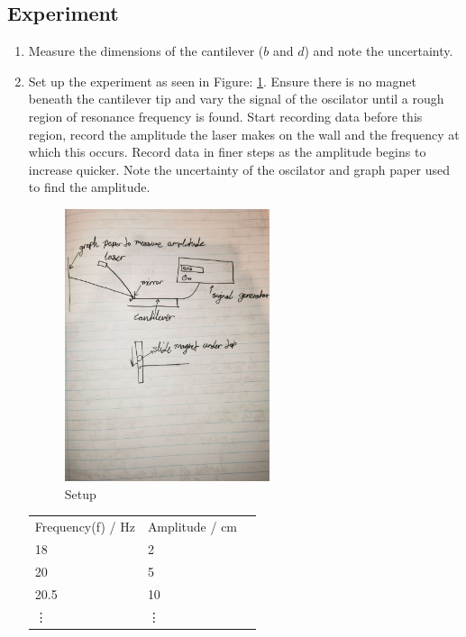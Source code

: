 \documentclass{article}
\begin{document}
\subsection*{Experiment}
\begin{enumerate}
    \item Measure the dimensions of the cantilever ($b$ and $d$) and note the uncertainty. 
    \item Set up the experiment as seen in Figure: \ref{fig}. Ensure there is no magnet beneath the cantilever tip and vary the signal of the oscilator until 
    a rough region of resonance frequency is found. Start recording data before this region, record the 
    amplitude the laser makes on the wall and the frequency at which this occurs. Record data in finer steps 
    as the amplitude begins to increase quicker. Note the uncertainty of the oscilator and graph paper used to 
    find the amplitude. 
    \begin{figure}[h]
        \centering
        \captionsetup{justification=centering}
        \includegraphics[width=6cm]{fig.jpg}
        \caption{Setup\label{fig}}
    \end{figure}
    \begin{tabular}{l l l}
        Frequency(f) / Hz & Amplitude / cm\\
        18 & 2\\
        20 & 5\\
        20.5 & 10\\
        \vdots & \vdots 
    \end{tabular}


\end{enumerate}
\end{document}
